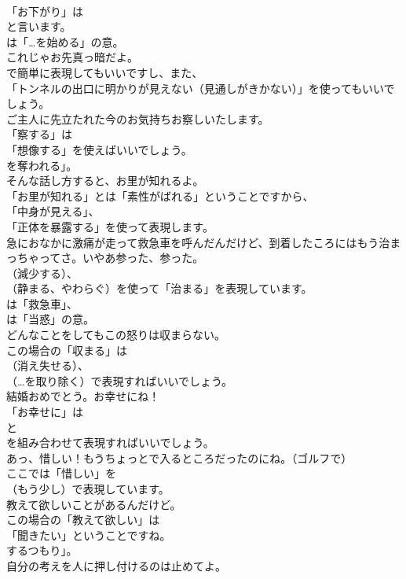 \documentclass[8pt]{extreport}
\begin{document}
\begin{CJK}{UTF8}{min}
\\	「お下がり」は 
\\	と言います。
\\	は「…を始める」の意。	
\\	これじゃお先真っ暗だよ。 
\\	で簡単に表現してもいいですし、また、
\\	「トンネルの出口に明かりが見えない（見通しがきかない）」を使ってもいいでしょう。	
\\	ご主人に先立たれた今のお気持ちお察しいたします。 
\\	「察する」は
\\	「想像する」を使えばいいでしょう。
\\	を奪われる」。	
\\	そんな話し方すると、お里が知れるよ。 
\\	「お里が知れる」とは「素性がばれる」ということですから、
\\	「中身が見える」、
\\	「正体を暴露する」を使って表現します。	
\\	急におなかに激痛が走って救急車を呼んだんだけど、到着したころにはもう治まっちゃってさ。いやあ参った、参った。 
\\	（減少する）、
\\	（静まる、やわらぐ）を使って「治まる」を表現しています。
\\	は「救急車」、
\\	は「当惑」の意。	
\\	どんなことをしてもこの怒りは収まらない。 
\\	この場合の「収まる」は 
\\	（消え失せる）、
\\	（…を取り除く）で表現すればいいでしょう。	
\\	結婚おめでとう。お幸せにね！ 
\\	「お幸せに」は
\\	と
\\	を組み合わせて表現すればいいでしょう。	
\\	あっ、惜しい！もうちょっとで入るところだったのにね。（ゴルフで） 
\\	ここでは「惜しい」を 
\\	（もう少し）で表現しています。	
\\	教えて欲しいことがあるんだけど。 
\\	この場合の「教えて欲しい」は
\\	「聞きたい」ということですね。
\\	するつもり」。	
\\	自分の考えを人に押し付けるのは止めてよ。 

\end{CJK}
\end{document}
